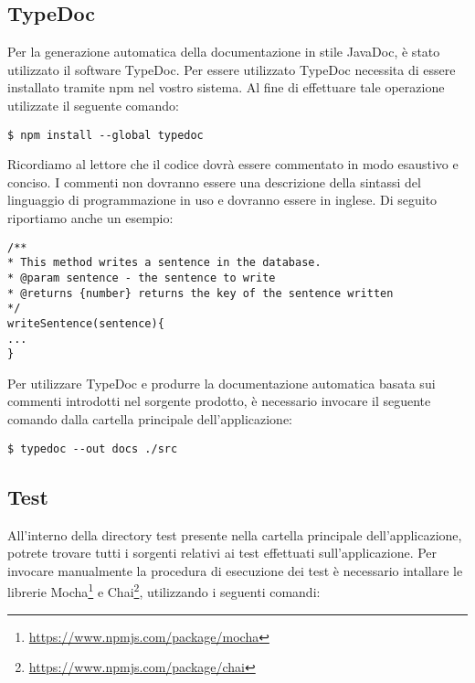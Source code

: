 \subsection{TypeDoc}
Per la generazione automatica della documentazione in stile JavaDoc, è stato utilizzato il software TypeDoc. 
Per essere utilizzato TypeDoc necessita di essere installato tramite npm nel vostro sistema. Al fine di effettuare tale operazione utilizzate il seguente comando:

\begin{center}
		\begin{minipage}{0.5\textwidth}
		\begin{lstlisting}[caption=Installazione di TypeDoc per la generazione della documentazione,numbers=none]
		$ npm install --global typedoc
			\end{lstlisting}		
		\end{minipage}
\end{center}

Ricordiamo al lettore che il codice dovrà essere commentato in modo esaustivo e conciso. I commenti non dovranno essere una descrizione della sintassi del linguaggio di programmazione in uso e dovranno essere in inglese. Di seguito riportiamo anche un esempio:

\begin{lstlisting}[caption=Esempio di commento ad un metodo]
/**
* This method writes a sentence in the database.
* @param sentence - the sentence to write
* @returns {number} returns the key of the sentence written
*/
writeSentence(sentence){
...
}
\end{lstlisting}

Per utilizzare TypeDoc e produrre la documentazione automatica basata sui commenti introdotti nel sorgente prodotto, è necessario invocare il seguente comando dalla cartella principale dell'applicazione:

\begin{center}
	\begin{minipage}{0.5\textwidth}
		\begin{lstlisting}[caption=Comandi per la generazione della documentazione,numbers=none]
			$ typedoc --out docs ./src
		\end{lstlisting}
	\end{minipage}
\end{center}
	
\subsection{Test}
All'interno della directory test presente nella cartella principale dell'applicazione, potrete trovare tutti i sorgenti relativi ai test effettuati sull'applicazione.
Per invocare manualmente la procedura di esecuzione dei test è necessario intallare le librerie Mocha\footnote{\url{https://www.npmjs.com/package/mocha}} e Chai\footnote{\url{https://www.npmjs.com/package/chai}}, utilizzando i seguenti comandi:


